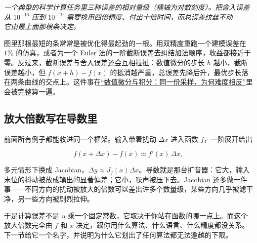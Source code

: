 \begin{center}

\emph{一个典型的科学计算任务里三种误差的相对量级（横轴为对数刻度）。把舍入误差从 \(10^{-16}\) 压到 \(10^{-19}\) 需要换用四倍精度、付出十倍时间，而总误差纹丝不动——它由最上面那根条决定。}
\end{center}

图里那根最短的条常常是被优化得最起劲的一根。用双精度重跑一个建模误差在 \(1\%\) 的仿真，或者为一个 Euler 法的一阶截断误差去纠结加法顺序，收益都接近于零。反过来，截断误差与舍入误差还会互相拉扯：数值微分的步长 \(h\) 越小，截断误差越小，但 \(f(x+h)-f(x)\) 的抵消越严重，总误差先降后升，最优步长落在两条曲线的交点上。这件事在\hyperref[ch:064]{``数值微分与积分：同一份采样，为何难度相反''}里会被完整算一遍。

\subsection{放大倍数写在导数里}

前面所有例子都能收进同一个框架。输入带着扰动 \(\Delta x\) 进入函数 \(f\)，一阶展开给出

\[
f(x+\Delta x)-f(x)\approx f'(x)\,\Delta x,
\]

多元情形下换成 Jacobian，\(\Delta y\approx J_f(x)\Delta x\)。导数就是那台扩音器：它大，输入末位的抖动被放成输出的显著偏差；它小，噪声被压下去。Jacobian 还多做一件事——不同方向的扰动被放大的倍数可以差出许多个数量级，某些方向几乎被滤干净，另一些方向被剧烈拉伸。

于是计算误差不是 \(u\) 乘一个固定常数，它取决于你站在函数的哪一点上。而这个放大倍数完全由 \(f\) 和 \(x\) 决定，跟你用什么算法、什么语言、什么精度都没关系。下一节给它一个名字，并说明为什么它划出了任何算法都无法逾越的下限。
